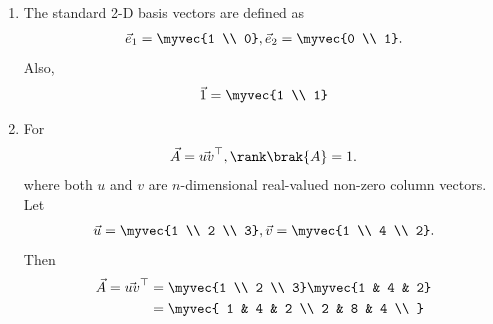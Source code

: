 \begin{enumerate}[label=\thesubsection.\arabic*, ref=\thesubsection.\theenumi]
\begin{align}
\label{eq:EE26BTECH11202-Fourier-shift-time}
		\end{align}
		\solution 
\begin{align}
 \int_{-\frac{1}{2f_0}}^{\frac{1}{2f_0}} x_0\brak{t-t_0} e^{-\j 2\pi n f_0 t} \, dt 
 &=
 \int_{-\frac{1}{2f_0}}^{\frac{1}{2f_0}} x_0\brak{t} e^{-\j 2\pi n f_0 \brak{t+t_0}} \, dt 
 \\
 &=
e^{\j 2\pi n f_0 t_0} \int_{-\frac{1}{2f_0}}^{\frac{1}{2f_0}} x_0\brak{t} e^{-\j 2\pi n f_0 t} \, dt 
\label{eq:EE26BTECH11202-Fourier-shift-time-1}
\end{align}
after a change of variables.  Note that the limits of integration are unchanged due the periodicity of $x(t)$.
Transferring the exponential term in \eqref{eq:EE26BTECH11202-Fourier-shift-time-1} to the L.H.S yields
\eqref{eq:EE26BTECH11202-Fourier-shift-time}.
	\item The standard 2-D basis vectors are defined as
		\begin{align}
			\vec{e}_1 = \myvec{1 \\ 0},
			\vec{e}_2 = \myvec{0 \\ 1}.
			\label{eq:EE26BTECH11202-2D-basis}
		\end{align}
		Also, 
		\begin{align}
			\vec{1} = \myvec{1 \\ 1}
			\label{eq:EE26BTECH11202-2D-one}
		\end{align}
\item For
	\begin{align}
			\label{eq:EE26BTECH11202-rank-one}
		\vec{A} = \vec{uv}^{\top}, \rank\brak{A} = 1.
\end{align}
	 where both $u$ and $v$ are $n$-dimensional real-valued non-zero column vectors. 
	 \\
	 \solution 
	 Let
\begin{align}
\vec{u} = \myvec{1 \\ 2 \\ 3}, \vec{v} = \myvec{1 \\ 4 \\ 2}.
\end{align}
Then
\begin{align}
\vec{A} = \vec{uv}^{\top} &= \myvec{1 \\ 2 \\ 3} \myvec{1 & 4 & 2} 
\\
			  &= \myvec{
1 & 4 & 2 \\
2 & 8 & 4 \\
}
\end{align}
\end{enumerate}
